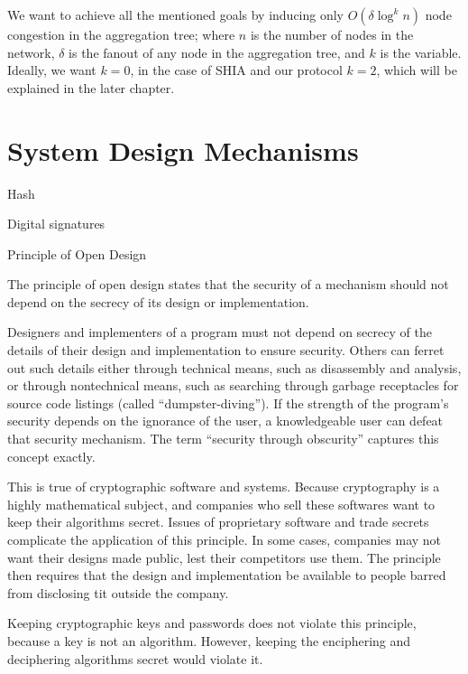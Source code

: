 	We want to achieve all the mentioned goals by inducing only $O(\delta \log^{k} n)$ node congestion in the aggregation tree; where $n$ is the number of nodes in the network, $\delta$ is the fanout of any node in the aggregation tree, and $k$ is the variable.
	Ideally, we want $k=0$, in the case of SHIA and our protocol $k=2$, which will be explained in the later chapter.

\section{System Design Mechanisms}
	Hash

	Digital signatures

		Principle of Open Design \cite{bishop2004introduction}
		\begin{definition}
			The principle of open design states that the security of a mechanism should not depend on the secrecy of its design or implementation.
			\label{def:open-design}
		\end{definition}
		Designers and implementers of a program must not depend on secrecy of the details of their design and implementation to ensure security.
		Others can ferret out such details either through technical means, such as disassembly and analysis, or through nontechnical means, such as searching through garbage receptacles for source code listings (called ``dumpster-diving'').
		If the strength of the program's security depends on the ignorance of the user, a knowledgeable user can defeat that security mechanism.
		The term ``security through obscurity'' captures this concept exactly.

		This is true of cryptographic software and systems.
		Because cryptography is a highly mathematical subject, and companies who sell these softwares want to keep their algorithms secret. 
		Issues of proprietary software and trade secrets complicate the application of this principle.
		In some cases, companies may not want their designs made public, lest their competitors use them.
		The principle then requires that the design and implementation be available to people barred from disclosing tit outside the company.

		Keeping cryptographic keys and passwords does not violate this principle, because a key is not an algorithm.
		However, keeping the enciphering and deciphering algorithms secret would violate it.

